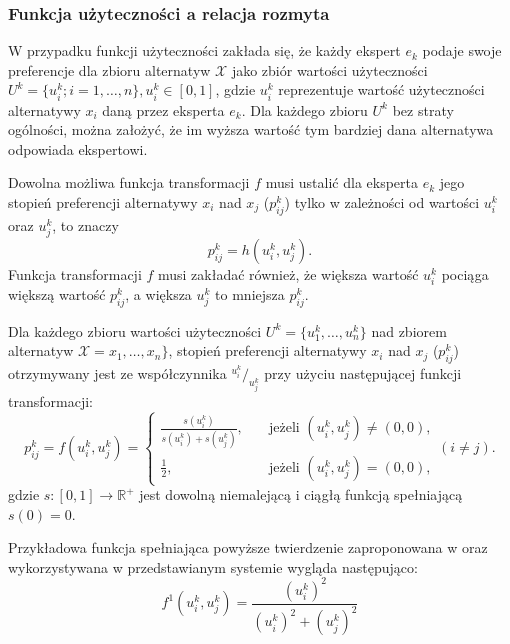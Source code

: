 \subsubsection{Funkcja użyteczności a relacja rozmyta}
W przypadku funkcji użyteczności zakłada się, że każdy ekspert $e_k$ podaje
swoje preferencje dla zbioru alternatyw $\mathcal{X}$ jako zbiór wartości
użyteczności $U^k = \{ u^k_i; i=1,\dotsc,n\}, u^k_i \in [0,1]$, gdzie
$u^k_i$ reprezentuje wartość użyteczności alternatywy $x_i$ daną przez eksperta
$e_k$. Dla każdego zbioru $U^k$ bez straty ogólności, można założyć, że im
wyższa wartość tym bardziej dana alternatywa odpowiada ekspertowi.

Dowolna możliwa funkcja transformacji $f$ musi ustalić dla eksperta $e_k$ jego
stopień preferencji alternatywy $x_i$ nad $x_j$ ($p^k_{ij}$) tylko w zależności
od wartości $u^k_i$ oraz $u^k_j$, to znaczy 
\begin{equation}
p^k_{ij} = h(u^k_i, u^k_j).
\end{equation}
Funkcja transformacji $f$ musi zakładać również, że większa wartość $u^k_i$
pociąga większą wartość $p^k_{ij}$, a większa $u^k_j$ to mniejsza $p^k_{ij}.$

\begin{theorem}
Dla każdego zbioru wartości użyteczności $U^k = \{ u^k_1, \dotsc, u^k_n \}$ nad
zbiorem alternatyw $\mathcal{X} = x_1, \dotsc, x_n\}$, stopień preferencji
alternatywy $x_i$ nad $x_j$ ($p^k_{ij}$) otrzymywany jest ze współczynnika
$^{u^k_i}/_{u^k_j}$ przy użyciu następującej funkcji transformacji:
\begin{equation}
p^k_{ij} = f(u^k_i, u^k_j) =
  \left\{ 
	\begin{array}{ll}
	  \frac{s(u^k_i)}{s(u^k_i) + s(u^k_j)} , & \quad \textrm{jeżeli } (u^k_i,u^k_j)
	  \neq (0,0) ,
	  \\
      \frac{1}{2} , & \quad \textrm{jeżeli } (u^k_i,u^k_j) = (0,0),
  	\end{array} 
  \right. (i \neq j) .
\end{equation}
gdzie $s : [0,1] \rightarrow \mathbb{R}^+$ jest dowolną niemalejącą i ciągłą
funkcją spełniającą $s(0) = 0.$
\end{theorem}

Przykładowa funkcja spełniająca powyższe twierdzenie zaproponowana w
\cite{Chiclana1996} oraz wykorzystywana w przedstawianym systemie wygląda
następująco:
\begin{equation}
f^1(u^k_i,u^k_j) = \frac{(u^k_i)^2}{(u^k_i)^2 + (u^k_j)^2}
\end{equation}

